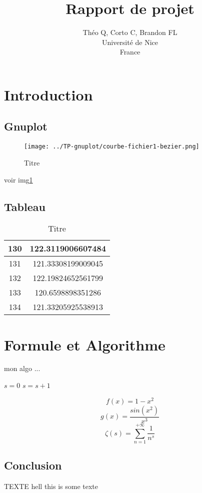 \documentclass{article}
\title{Rapport de projet}
\author{Théo Q, Corto C, Brandon FL \\
Université de Nice\\
France}
\begin{document}
\maketitle


\section{Introduction}



\subsection{Gnuplot}
\begin{figure}[h]
\centering
\texttt{[image: ../TP-gnuplot/courbe-fichier1-bezier.png]} 
\caption{Titre}
\label{fig:toto}
\end{figure}
voir img\ref{fig:toto}

\subsection{Tableau}
\begin{table}[h]
\centering
\begin{tabular}{|c|c|}
\hline 
130 & 122.3119006607484 \\ 
\hline 
131 & 121.33308199009045 \\ 
\hline 
132 & 122.19824652561799 \\ 
\hline 
133 & 120.6598898351286 \\ 
\hline 
134 & 121.33205925538913 \\ 
\hline 
\end{tabular} 
\caption{Titre}
\label{tab:toto2}
\end{table}


\section{Formule et Algorithme}
\begin{algorithm}[H]
\caption{mon algo ...}
\begin{algorithmic}[1]
\STATE $s =0$
\STATE $s= s + 1$
\ENDIF
\ENDFOR
\end{algorithmic}
\end{algorithm}

\begin{equation}
f(x)=1 - x^2
\end{equation}
\begin{equation}
g(x)=\frac{sin(x^2)}{x^3}
\end{equation}
\begin{equation}
\zeta(s)= \sum_{n=1}^{+\infty}\frac1{n^s}
\end{equation}

\subsection{Conclusion}
TEXTE
hell this is some texte
\end{document}
